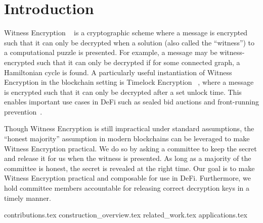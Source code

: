 \section{Introduction}


Witness Encryption ~\cite{witness_encryption} is a cryptographic scheme where a message is encrypted such that it can only be decrypted when a solution (also called the ``witness'') to a computational puzzle is presented.
For example, a message may be witness-encrypted such that it can only be decrypted if for some connected graph, a Hamiltonian cycle is found.
A particularly useful instantiation of Witness Encryption in the blockchain setting is Timelock Encryption ~\cite{timelock_puzzles,timelock_from_crc,timed_release_cryptography}, where a message is encrypted such that it can only be decrypted after a set unlock time.
This enables important use cases in DeFi such as sealed bid auctions and front-running prevention~\cite{i-TiRE}.

Though Witness Encryption is still impractical under standard assumptions, the ``honest majority'' assumption in modern blockchains can be leveraged to make Witness Encryption practical.
We do so by asking a committee to keep the secret and release it for us when the witness is presented.
As long as a majority of the committee is honest, the secret is revealed at the right time.
Our goal is to make Witness Encryption practical and composable for use in DeFi.
Furthermore, we hold committee members accountable for releasing correct decryption keys in a timely manner.

{contributions.tex}
{construction_overview.tex}
{related_work.tex}
{applications.tex}